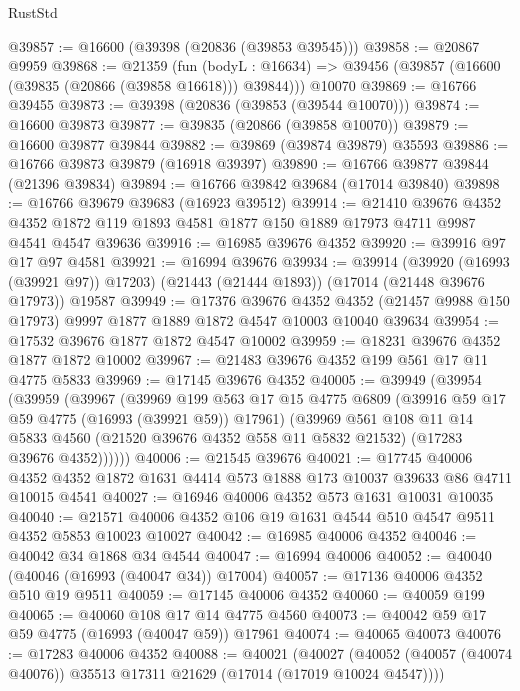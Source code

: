 \begin{lexlean}{RustStd}
\begin{coremodule}
@39857 := @16600 (@39398 (@20836 (@39853 @39545)))
@39858 := @20867 @9959
@39868 := @21359
    (fun (bodyL : @16634) => @39456 (@39857 (@16600 (@39835 (@20866 (@39858 @16618))) @39844)))
    @10070
@39869 := @16766 @39455
@39873 := @39398 (@20836 (@39853 (@39544 @10070)))
@39874 := @16600 @39873
@39877 := @39835 (@20866 (@39858 @10070))
@39879 := @16600 @39877 @39844
@39882 := @39869 (@39874 @39879) @35593
@39886 := @16766 @39873 @39879 (@16918 @39397)
@39890 := @16766 @39877 @39844 (@21396 @39834)
@39894 := @16766 @39842 @39684 (@17014 @39840)
@39898 := @16766 @39679 @39683 (@16923 @39512)
@39914 := @21410
    @39676
    @4352
    @4352
    @1872
    @119
    @1893
    @4581
    @1877
    @150
    @1889
    @17973
    @4711
    @9987
    @4541
    @4547
    @39636
@39916 := @16985 @39676 @4352
@39920 := @39916 @97 @17 @97 @4581
@39921 := @16994 @39676
@39934 := @39914
    (@39920 (@16993 (@39921 @97)) @17203)
    (@21443 (@21444 @1893))
    (@17014 (@21448 @39676 @17973))
    @19587
@39949 := @17376
    @39676
    @4352
    @4352
    (@21457 @9988 @150 @17973)
    @9997
    @1877
    @1889
    @1872
    @4547
    @10003
    @10040
    @39634
@39954 := @17532 @39676 @1877 @1872 @4547 @10002
@39959 := @18231 @39676 @4352 @1877 @1872 @10002
@39967 := @21483 @39676 @4352 @199 @561 @17 @11 @4775 @5833
@39969 := @17145 @39676 @4352
@40005 := @39949
    (@39954
      (@39959
        (@39967
          (@39969
            @199
            @563
            @17
            @15
            @4775
            @6809
            (@39916 @59 @17 @59 @4775 (@16993 (@39921 @59)) @17961)
            (@39969
              @561
              @108
              @11
              @14
              @5833
              @4560
              (@21520 @39676 @4352 @558 @11 @5832 @21532)
              (@17283 @39676 @4352))))))
@40006 := @21545 @39676
@40021 := @17745
    @40006
    @4352
    @4352
    @1872
    @1631
    @4414
    @573
    @1888
    @173
    @10037
    @39633
    @86
    @4711
    @10015
    @4541
@40027 := @16946 @40006 @4352 @573 @1631 @10031 @10035
@40040 := @21571 @40006 @4352 @106 @19 @1631 @4544 @510 @4547 @9511 @4352 @5853 @10023 @10027
@40042 := @16985 @40006 @4352
@40046 := @40042 @34 @1868 @34 @4544
@40047 := @16994 @40006
@40052 := @40040 (@40046 (@16993 (@40047 @34)) @17004)
@40057 := @17136 @40006 @4352 @510 @19 @9511
@40059 := @17145 @40006 @4352
@40060 := @40059 @199
@40065 := @40060 @108 @17 @14 @4775 @4560
@40073 := @40042 @59 @17 @59 @4775 (@16993 (@40047 @59)) @17961
@40074 := @40065 @40073
@40076 := @17283 @40006 @4352
@40088 := @40021
    (@40027 (@40052 (@40057 (@40074 @40076)) @35513 @17311 @21629 (@17014 (@17019 @10024 @4547))))

\end{coremodule}
\end{lexlean}
